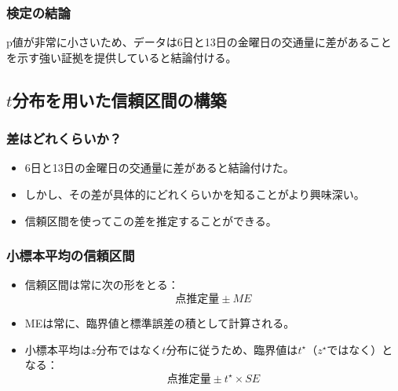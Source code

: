\begin{frame}
\frametitle{検定の結論}


p値が非常に小さいため、データは6日と13日の金曜日の交通量に差があることを示す強い証拠を提供していると結論付ける。

\end{frame}


\subsection{$t$分布を用いた信頼区間の構築}


\begin{frame}
\frametitle{差はどれくらいか？}

\begin{itemize}

\item 6日と13日の金曜日の交通量に差があると結論付けた。

\item しかし、その差が具体的にどれくらいかを知ることがより興味深い。

\item 信頼区間を使ってこの差を推定することができる。

\end{itemize}

\end{frame}


\begin{frame}
\frametitle{小標本平均の信頼区間}

\begin{itemize}

\item 信頼区間は常に次の形をとる：
\[ \text{点推定量} \pm {ME} \]

\item MEは常に、臨界値と標準誤差の積として計算される。

\item 小標本平均は$z$分布ではなく$t$分布に従うため、臨界値は$t^\star$（$z^\star$ではなく）となる：
\[ \text{点推定量} \pm t^{\star} \times SE \]

\end{itemize}

\end{frame}

